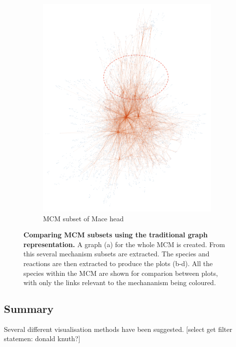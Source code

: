 \begin{figure}[H]
\begin{subfigure}[b]{0.495\textwidth}
           \includegraphics[width=\textwidth]{figures_c1/graph_compare/macehead.png}
           \caption{MCM subset of Mace head}
           \label{fig:macehead}
       \end{subfigure}
        \caption{\textbf{Comparing MCM subsets using the traditional graph representation.} A graph (a) for the whole MCM is created. From this several mechanism subsets are extracted. The species and reactions are then extracted to produce the plots (b-d). All the species within the MCM are shown for comparion between plots, with only the links relevant to the mechananism being coloured.   }
        \label{fig:graphplots}
\end{figure}







\subsection{Summary}
Several different visualisation methods have been suggested. [select get filter statemen: donald knuth?]

